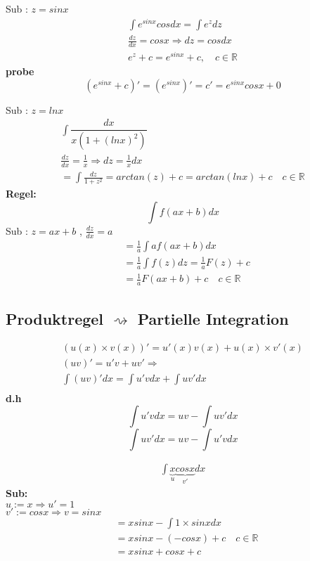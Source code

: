 \begin{example}
Sub : $z = sinx$
\begin{align*}
\int {e^{sinx} cos} dx = \int e^z dz\\
\frac{dz}{dx} = cos x \Rightarrow dz = cos dx\\
 e^z + c = e^{sin x } + c, \quad c \in \mathbb{R}
\end{align*}
\textbf{probe}
$$ (e^{sinx} + c)' = (e^{sinx})' = c' = e^{sinx} cosx + 0 $$
\end{example}
\begin{example}
Sub : $z = lnx $
\begin{gather*}
\int \dfrac{dx}{ x (1+(lnx)^2)}\\
\frac{dz}{dx} = \frac{1}{x} \Rightarrow dz = \frac{1}{x} dx
\\
= \int \frac{dz}{ 1 + z^2} = arctan(z) + c = arctan(ln x )+ c \quad c \in \mathbb{R}
\end{gather*}
\textbf{Regel:}
$$ \int f(ax+b)dx $$
Sub : $z = ax+b $ , $ \frac{dz}{dx} = a $
\begin{align*}
&= \frac{1}{a} \int a f(ax+b) dx \\
&= \frac{1}{a} \int f(z)dz = \frac{1}{a} F(z) + c \\
&=\frac{1}{a} F(ax +b) + c \quad c \in \mathbb{R}
\end{align*}
\end{example}
\subsection{Produktregel $\rightsquigarrow$  \textbf{Partielle Integration}}
\begin{gather*}
(u(x) \times v(x))' = u'(x) v(x) + u(x) \times v'(x)\\
(uv)' = u'v + uv' \Rightarrow\\
\int(uv)'dx = \int u'v dx + \int uv' dx\\
\end{gather*}
\textbf{d.h}
\[ \int u'v dx = u v - \int u v' dx \]
\[ \int uv' dx = u v - \int u' v dx \]
\begin{example}
\begin{align*}
\int \underbrace{x}_{u} \underbrace{cosx}_{v'} dx 
\end{align*}
\textbf{Sub:}\\
$u  := x \Rightarrow u' = 1$\\
$v' := cos x \Rightarrow v = sinx $
\begin{align*}
&= x sinx - \int 1 \times sinx dx \\
&= x sinx - (-cos x) + c \quad c \in \mathbb{R}\\
&= x sinx + cos x + c
\end{align*}
\end{example}

